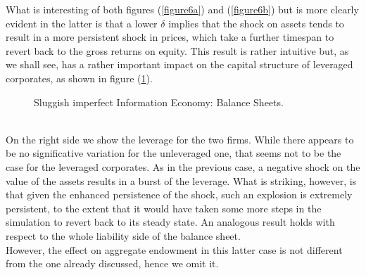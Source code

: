 \documentclass[11pt]{article}
\begin{document}
What is interesting of both figures (\ref{figure6a}) and (\ref{figure6b}) but is more clearly evident in the latter is that a lower $\delta$ implies that the shock on assets tends to result in a more persistent shock in prices, which take a further timespan to revert back to the gross returns on equity. This result is rather intuitive but, as we shall see, has a rather important impact on the capital structure of leveraged corporates, as shown in figure (\ref{figure7}).
\begin{figure}[h!]
\centering
{}\quad
{}
 \caption{Sluggish imperfect Information Economy: Balance Sheets.} \label{figure7}
\end{figure}\\
On the right side we show the leverage for the two firms. While there appears to be no significative variation for the unleveraged one, that seems not to be the case for the leveraged corporates. As in the previous case, a negative shock on the value of the assets results in a burst of the leverage. What is striking, however, is that given the enhanced persistence of the shock, such an explosion is extremely persistent, to the extent that it would have taken some more steps in the simulation to revert back to its steady state. An analogous result holds with respect to the whole liability side of the balance sheet.\\
However, the effect on aggregate endowment in this latter case is not different from the one already discussed, hence we omit it.
\end{document}
